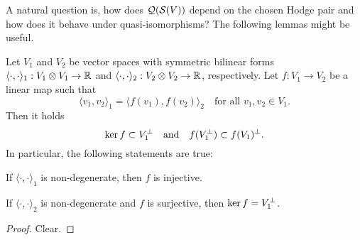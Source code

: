 \documentclass[\MainFolder/Text.tex]{subfiles}
\begin{document}

A natural question is, how does $\mathcal{Q}(\mathcal{S}(V))$ depend on the chosen Hodge pair and how does it behave under quasi-isomorphisms? The following lemmas might be useful.

\begin{Lemma}\label{Lem:PomLemma}
Let $V_1$ and $V_2$ be vector spaces with symmetric bilinear forms $\langle \cdot,\cdot \rangle_1: V_1 \otimes V_1 \rightarrow \mathbb{R}$ and $\langle \cdot,\cdot\rangle_2: V_2\otimes V_2 \rightarrow \mathbb{R}$, respectively. Let $f: V_1 \rightarrow V_2$ be a linear map such that
\begin{equation}\label{Eq:Isometryyy}
\langle v_1, v_2 \rangle_1 = \langle f(v_1), f(v_2) \rangle_2 \quad \text{for all }v_1, v_2 \in V_1.
\end{equation}
Then it holds 
\[ \operatorname{ker} f \subset V_1^\perp\quad\text{and}\quad f(V_1^\perp)\subset f(V_1)^\perp. \]
In particular, the following statements are true:
\begin{ClaimList}
\item If $\langle\cdot,\cdot\rangle_1$ is non-degenerate, then $f$ is injective.
\item If $\langle\cdot,\cdot\rangle_2$ is non-degenerate and $f$ is surjective, then $\operatorname{ker} f = V_1^\perp$.
\end{ClaimList}
\end{Lemma}
\begin{proof}
Clear.
\end{proof}
\end{document}
